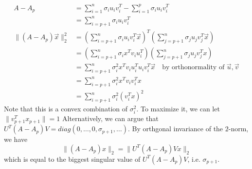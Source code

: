 \documentclass[../main]{subfiles}
\begin{document}
\begin{solution}
    \begin{align*}
        A-A_p &= \sum_{i=1}^n \sigma_i u_i v_i^T - \sum_{i=1}^p \sigma_i u_iv_i^T\\
        &= \sum_{i=p+1}^n \sigma_iu_iv_i^T\\
        \|(A-A_p)\vec x\|_2^2 &= \left(\sum_{i=p+1}^n \sigma_iu_iv_i^T \vec x \right)^T\left(\sum_{j=p+1}^n \sigma_ju_jv_j^T \vec x\right)\\
        &=\left(\sum_{i=p+1}^n \sigma_i x^Tv_i u_i^T \right) \left(\sum_{j=p+1}^n \sigma_ju_jv_j^Tx\right)\\
        &= \sum_{i=p+1}^n\sigma_i^2 x^T v_i u_i^T u_i v_i^T \vec x \quad \text{by orthonormality of $\vec u, \vec v$}\\
        &= \sum_{i=p+1}^n \sigma_i^2 x^T v_i v_i^T x\\
        &= \sum_{i=p+1}^n \sigma_i^2 (v_i^Tx)^2
    \end{align*} 
    Note that this is a convex combination of $\sigma_i^2$. To maximize it, we can let $\|v_{p+1}^Tx_{p+1}\|=1$
    Alternatively, we can argue that $U^T(A-A_p) V = diag(0,\dots, 0,\sigma_{p+1},\dots)$. By orthgonal invariance of the $2$-norm, we have 
    \[
    \|(A-A_p)x\|_2 = \|U^T(A-A_p)Vx\|_2
    \]
    which is equal to the biggest singular value of $U^T(A-A_p)V$, i.e. $\sigma_{p+1}$. 
\end{solution}
\end{document}
